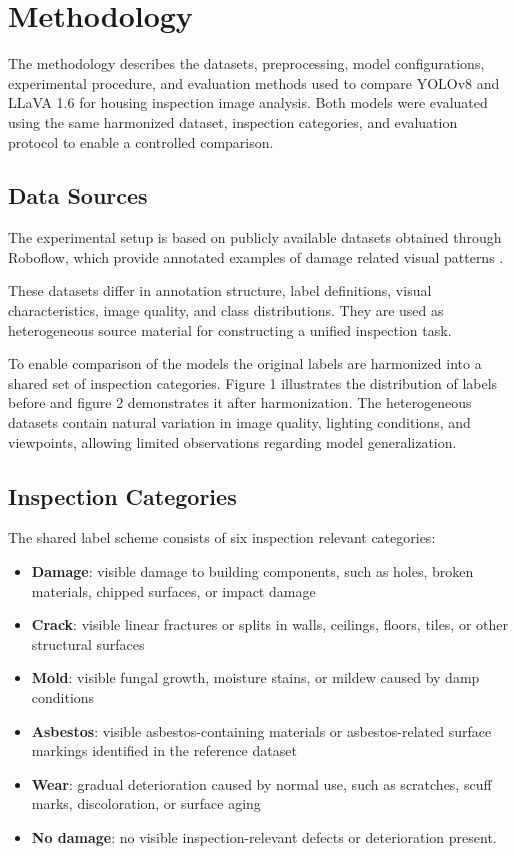 \section{Methodology}
\label{sec:methodology}

The methodology describes the datasets, preprocessing, model configurations, experimental procedure, and evaluation methods used to compare YOLOv8 and LLaVA 1.6 for housing inspection image analysis. Both models were evaluated using the same harmonized dataset, inspection categories, and evaluation protocol to enable a controlled comparison.

\subsection{Data Sources}
\label{subsec:data_sources}

The experimental setup is based on publicly available datasets obtained through Roboflow, which provide annotated examples of damage related visual patterns \cite{noauthor_roboflow_nodate}.

These datasets differ in annotation structure, label definitions, visual characteristics, image quality, and class distributions. They are used as heterogeneous source material for constructing a unified inspection task. 

To enable comparison of the models the original labels are harmonized into a shared set of inspection categories. Figure 1 illustrates the distribution of labels before and figure 2 demonstrates it after harmonization. The heterogeneous datasets contain natural variation in image quality, lighting conditions, and viewpoints, allowing limited observations regarding model generalization.

\subsection{Inspection Categories}
\label{subsec:inspection_categories}

The shared label scheme consists of six inspection relevant categories:

\begin{itemize}
    \item \textbf{Damage}: visible damage to building components, such as holes, broken materials, chipped surfaces, or impact damage
    \item \textbf{Crack}: visible linear fractures or splits in walls, ceilings, floors, tiles, or other structural surfaces
    \item \textbf{Mold}: visible fungal growth, moisture stains, or mildew caused by damp conditions
    \item \textbf{Asbestos}: visible asbestos-containing materials or asbestos-related surface markings identified in the reference dataset
    \item \textbf{Wear}: gradual deterioration caused by normal use, such as scratches, scuff marks, discoloration, or surface aging
    \item \textbf{No damage}: no visible inspection-relevant defects or deterioration present.
\end{itemize}


